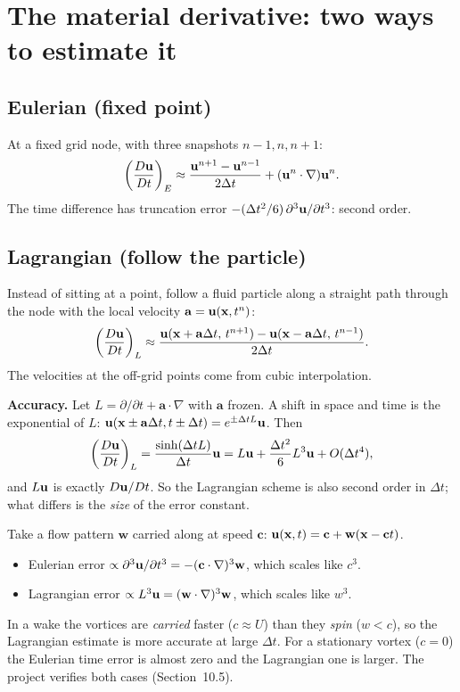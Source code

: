 \section{The material derivative: two ways to estimate it}

\subsection{Eulerian (fixed point)}
At a fixed grid node, with three snapshots $n-1,n,n+1$:
\begin{equation}
\left(\frac{D\mathbf{u}}{Dt}\right)_E \approx \frac{\mathbf{u}^{n+1}-\mathbf{u}^{n-1}}{2\Delta t} + (\mathbf{u}^n\cdot\nabla)\mathbf{u}^n .
\end{equation}
The time difference has truncation error $-(\Delta t^2/6)\,\partial^3\mathbf{u}/\partial t^3$: second order.

\subsection{Lagrangian (follow the particle)}
Instead of sitting at a point, follow a fluid particle along a straight path through the node with the local velocity $\mathbf{a}=\mathbf{u}(\mathbf{x},t^n)$:
\begin{equation}
\left(\frac{D\mathbf{u}}{Dt}\right)_L \approx \frac{\mathbf{u}(\mathbf{x}+\mathbf{a}\Delta t,\,t^{n+1})-\mathbf{u}(\mathbf{x}-\mathbf{a}\Delta t,\,t^{n-1})}{2\Delta t}.
\end{equation}
The velocities at the off-grid points come from cubic interpolation.

\textbf{Accuracy.} Let $L=\partial/\partial t+\mathbf{a}\cdot\nabla$ with $\mathbf{a}$ frozen. A shift in space and time is the exponential of $L$: $\mathbf{u}(\mathbf{x}\pm\mathbf{a}\Delta t,t\pm\Delta t)=e^{\pm\Delta t L}\mathbf{u}$. Then
\begin{equation}
\left(\frac{D\mathbf{u}}{Dt}\right)_L=\frac{\sinh(\Delta t L)}{\Delta t}\mathbf{u} = L\mathbf{u}+\frac{\Delta t^2}{6}L^3\mathbf{u}+O(\Delta t^4),
\end{equation}
and $L\mathbf{u}$ is exactly $D\mathbf{u}/Dt$. So the Lagrangian scheme is also second order in $\Delta t$; what differs is the \emph{size} of the error constant.

\begin{keyidea}
Take a flow pattern $\mathbf{w}$ carried along at speed $\mathbf{c}$: $\mathbf{u}(\mathbf{x},t)=\mathbf{c}+\mathbf{w}(\mathbf{x}-\mathbf{c}t)$.
\begin{itemize}
\item Eulerian error $\propto \partial^3\mathbf{u}/\partial t^3 = -(\mathbf{c}\cdot\nabla)^3\mathbf{w}$, which scales like $c^3$.
\item Lagrangian error $\propto L^3\mathbf{u}=(\mathbf{w}\cdot\nabla)^3\mathbf{w}$, which scales like $w^3$.
\end{itemize}
In a wake the vortices are \emph{carried} faster ($c\approx U$) than they \emph{spin} ($w<c$), so the Lagrangian estimate is more accurate at large $\Delta t$. For a stationary vortex ($c=0$) the Eulerian time error is almost zero and the Lagrangian one is larger. The project verifies both cases (Section~10.5).
\end{keyidea}

